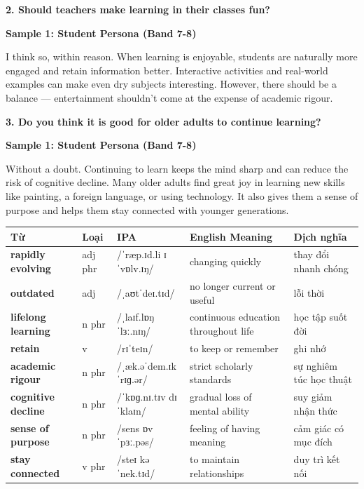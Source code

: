 \begin{ieltsquestion}
\textbf{2. Should teachers make learning in their classes fun?}
\end{ieltsquestion}
\textbf{Sample 1: Student Persona (Band 7-8)}

I think so, within reason. When learning is enjoyable, students are naturally more engaged and retain information better. Interactive activities and real-world examples can make even dry subjects interesting. However, there should be a balance — entertainment shouldn't come at the expense of academic rigour.

\separator

\begin{ieltsquestion}
\textbf{3. Do you think it is good for older adults to continue learning?}
\end{ieltsquestion}
\textbf{Sample 1: Student Persona (Band 7-8)}

Without a doubt. Continuing to learn keeps the mind sharp and can reduce the risk of cognitive decline. Many older adults find great joy in learning new skills like painting, a foreign language, or using technology. It also gives them a sense of purpose and helps them stay connected with younger generations.

\separator


\vspace{0.8em}
\begin{center}
\renewcommand{\arraystretch}{1.65}
\begin{tabularx}{\textwidth}{|V{0.22\textwidth}|C{0.07\textwidth}|I{0.20\textwidth}|Y|V{0.18\textwidth}|}
\hline
{}
\textbf{Từ} & \textbf{Loại} & \textbf{IPA} & \textbf{English Meaning} & \textbf{Dịch nghĩa} \\
\hline
\textbf{rapidly evolving} & adj phr & /ˈræp.ɪd.li ɪˈvɒlv.ɪŋ/ & changing quickly & thay đổi nhanh chóng \\ \hline
\textbf{outdated} & adj & /ˌaʊtˈdeɪ.tɪd/ & no longer current or useful & lỗi thời \\ \hline
\textbf{lifelong learning} & n phr & /ˌlaɪf.lɒŋ ˈlɜː.nɪŋ/ & continuous education throughout life & học tập suốt đời \\ \hline
\textbf{retain} & v & /rɪˈteɪn/ & to keep or remember & ghi nhớ \\ \hline
\textbf{academic rigour} & n phr & /ˌæk.əˈdem.ɪk ˈrɪɡ.ər/ & strict scholarly standards & sự nghiêm túc học thuật \\ \hline
\textbf{cognitive decline} & n phr & /ˈkɒɡ.nɪ.tɪv dɪˈklaɪn/ & gradual loss of mental ability & suy giảm nhận thức \\ \hline
\textbf{sense of purpose} & n phr & /sens ɒv ˈpɜː.pəs/ & feeling of having meaning & cảm giác có mục đích \\ \hline
\textbf{stay connected} & v phr & /steɪ kəˈnek.tɪd/ & to maintain relationships & duy trì kết nối \\ \hline
\end{tabularx}
\end{center}

